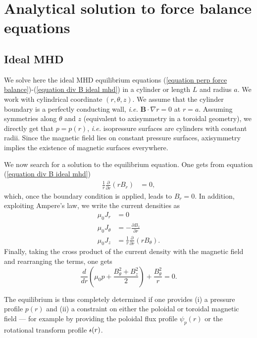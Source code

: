\appendix
\chapter{Analytical solution to force balance equations}

\section{Ideal MHD}
\label{appendix jxb=grad p solution}
We solve here the ideal MHD equilibrium equations (\ref{equation perp force balance})-(\ref{equation div B ideal mhd}) in a cylinder or length $L$ and radius $a$. We work with cylindrical coordinate $(r,\theta,z)$. We assume that the cylinder boundary is a perfectly conducting wall, \textit{i.e.} $\mathbf{B}\cdot\nabla r=0$ at $r=a$. Assuming symmetries along $\theta$ and $z$ (equivalent to axisymmetry in a toroidal geometry), we directly get that $p=p(r)$, \textit{i.e.} isopressure surfaces are cylinders with constant radii. Since the magnetic field lies on constant pressure surfaces, axisymmetry implies the existence of magnetic surfaces everywhere.

We now search for a solution to the equilibrium equation. One gets from equation (\ref{equation div B ideal mhd})
\begin{align}
\frac{1}{r}\frac{\partial}{\partial r}(r B_r) &= 0, 
\end{align}
which, once the boundary condition is applied, leads to $B_r=0$. In addition, exploiting Ampere's law, we write the current densities as
\begin{align}
	\mu_0J_r &= 0\\
	\mu_0J_\theta &= -\frac{\partial B_z}{\partial r}\\
	\mu_0J_z &= \frac{1}{r}\frac{\partial}{\partial r}(rB_\theta).
\end{align} 
Finally, taking the cross product of the current density with the magnetic field and rearranging the terms, one gets
\begin{equation}
	\frac{d}{dr}\left(\mu_0p + \frac{B_\theta^2 + B_z^2}{2}\right) + \frac{B_\theta^2}{r} = 0.
\end{equation}

The equilibrium is thus completely determined if one provides (i) a pressure profile $p(r)$ and (ii) a constraint on either the poloidal or toroidal magnetic field --- for example by providing the poloidal flux profile $\psi_p(r)$ or the rotational transform profile $\text{$\iota\!\!$-}(r)$.


